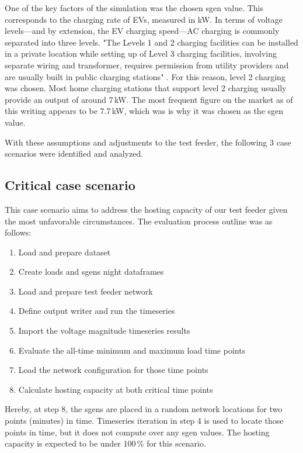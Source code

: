\documentclass[a4paper,10pt]{report}
\begin{document}
One of the key factors of the simulation was the chosen sgen value. This corresponds to the charging rate of EVs, measured in kW. In terms of voltage levels---and by extension, the EV charging speed---AC charging is commonly separated into three levels. "The Levels 1 and 2 charging facilities can be installed in a private location while setting up of Level 3 charging facilities, involving separate wiring and transformer, requires permission from utility providers and are usually built in public charging stations" \cite{Das2020}. For this reason, level 2 charging was chosen. Most home charging stations that support level 2 charging usually provide an output of around 7\,kW. The most frequent figure on the market as of this writing appears to be 7.7\,kW, which was is why it was chosen as the sgen value.

With these assumptions and adjustments to the test feeder, the following 3 case scenarios were identified and analyzed.

\subsection{Critical case scenario}
This case scenario aims to address the hosting capacity of our test feeder given the most unfavorable circumstances. The evaluation process outline was as follows:
\begin{enumerate}
	\item Load and prepare dataset
	\item Create loads and sgens night dataframes
	\item Load and prepare test feeder network
	\item Define output writer and run the timeseries
	\item Import the voltage magnitude timeseries results
	\item Evaluate the all-time minimum and maximum load time points
	\item Load the network configuration for those time points
	\item Calculate hosting capacity at both critical time points
\end{enumerate}

Hereby, at step 8, the sgens are placed in a random network locations for two points (minutes) in time. Timeseries iteration in step 4 is used to locate those points in time, but it does not compute over any sgen values. The hosting capacity is expected to be under 100\,\% for this scenario.
\end{document}

